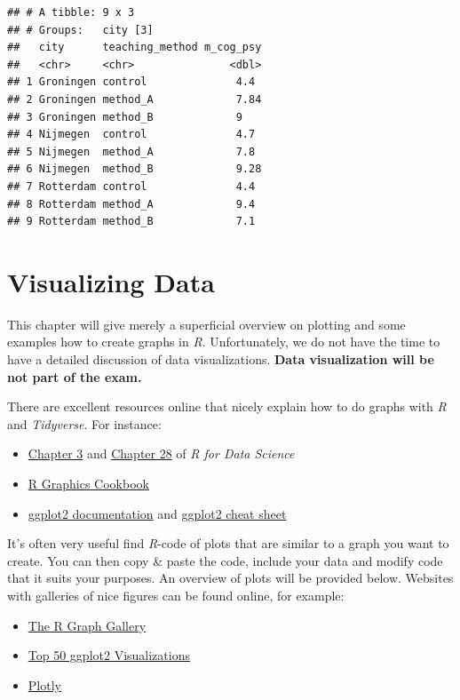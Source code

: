 \documentclass[
]{scrartcl}
\providecommand{\tightlist}{%
  \setlength{\itemsep}{0pt}\setlength{\parskip}{0pt}}
\begin{document}
\begin{verbatim}
## # A tibble: 9 x 3
## # Groups:   city [3]
##   city      teaching_method m_cog_psy
##   <chr>     <chr>               <dbl>
## 1 Groningen control              4.4 
## 2 Groningen method_A             7.84
## 3 Groningen method_B             9   
## 4 Nijmegen  control              4.7 
## 5 Nijmegen  method_A             7.8 
## 6 Nijmegen  method_B             9.28
## 7 Rotterdam control              4.4 
## 8 Rotterdam method_A             9.4 
## 9 Rotterdam method_B             7.1
\end{verbatim}

\section{Visualizing Data}\label{visualizing-data}

This chapter will give merely a superficial overview on plotting and some examples how to create graphs in \emph{R}. Unfortunately, we do not have the time to have a detailed discussion of data visualizations. \textbf{Data visualization will be not part of the exam.}

There are excellent resources online that nicely explain how to do graphs with \emph{R} and \emph{Tidyverse}. For instance:

\begin{itemize}
\tightlist
\item
  \href{http://r4ds.had.co.nz/data-visualisation.html}{Chapter 3} and \href{Chapter\%2028:\%20Graphics\%20for\%20communication}{Chapter 28} of \emph{R for Data Science}
\item
  \href{http://www.cookbook-r.com/Graphs/}{R Graphics Cookbook}
\item
  \href{https://ggplot2.tidyverse.org/reference/}{ggplot2 documentation} and \hyperref[cheatsheets]{ggplot2 cheat sheet}
\end{itemize}

It's often very useful find \emph{R}-code of plots that are similar to a graph you want to create. You can then copy \& paste the code, include your data and modify code that it suits your purposes. An overview of plots will be provided below. Websites with galleries of nice figures can be found online, for example:

\begin{itemize}
\tightlist
\item
  \href{http://www.r-graph-gallery.com/}{The R Graph Gallery}
\item
  \href{http://r-statistics.co/Top50-Ggplot2-Visualizations-MasterList-R-Code.html}{Top 50 ggplot2 Visualizations}
\item
  \href{https://plotly.com/ggplot2/}{Plotly}
\end{itemize}
\end{document}
